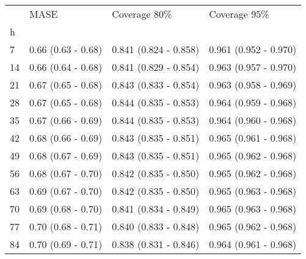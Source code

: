\begin{tabular}{llll}
\toprule
{} &                MASE &           Coverage 80\% &           Coverage 95\% \\
h  &                     &                        &                        \\
\midrule
7  &  0.66 (0.63 - 0.68) &  0.841 (0.824 - 0.858) &  0.961 (0.952 - 0.970) \\
14 &  0.66 (0.64 - 0.68) &  0.841 (0.829 - 0.854) &  0.963 (0.957 - 0.970) \\
21 &  0.67 (0.65 - 0.68) &  0.843 (0.833 - 0.854) &  0.963 (0.958 - 0.969) \\
28 &  0.67 (0.65 - 0.68) &  0.844 (0.835 - 0.853) &  0.964 (0.959 - 0.968) \\
35 &  0.67 (0.66 - 0.69) &  0.844 (0.835 - 0.853) &  0.964 (0.960 - 0.968) \\
42 &  0.68 (0.66 - 0.69) &  0.843 (0.835 - 0.851) &  0.965 (0.961 - 0.968) \\
49 &  0.68 (0.67 - 0.69) &  0.843 (0.835 - 0.851) &  0.965 (0.962 - 0.968) \\
56 &  0.68 (0.67 - 0.70) &  0.842 (0.835 - 0.850) &  0.965 (0.962 - 0.968) \\
63 &  0.69 (0.67 - 0.70) &  0.842 (0.835 - 0.850) &  0.965 (0.963 - 0.968) \\
70 &  0.69 (0.68 - 0.70) &  0.841 (0.834 - 0.849) &  0.965 (0.963 - 0.968) \\
77 &  0.70 (0.68 - 0.71) &  0.840 (0.833 - 0.848) &  0.965 (0.962 - 0.968) \\
84 &  0.70 (0.69 - 0.71) &  0.838 (0.831 - 0.846) &  0.964 (0.961 - 0.968) \\
\bottomrule
\end{tabular}
